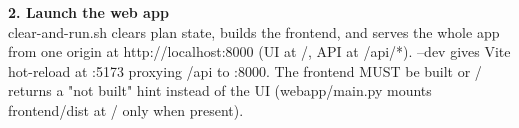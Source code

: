 \documentclass[10pt]{article}
\begin{document}
\smallskip\noindent\textbf{2. Launch the web app}\\[1pt]
clear-and-run.sh clears plan state, builds the frontend, and serves the whole app from one origin at http:/\allowbreak{}/\allowbreak{}localhost:8000 (UI at /\allowbreak{}, API at /\allowbreak{}api/\allowbreak{}*). --dev gives Vite hot-reload at :5173 proxying /\allowbreak{}api to :8000. The frontend MUST be built or /\allowbreak{} returns a "not built" hint instead of the UI (webapp/\allowbreak{}main.py mounts frontend/\allowbreak{}dist at /\allowbreak{} only when present).
\end{document}
